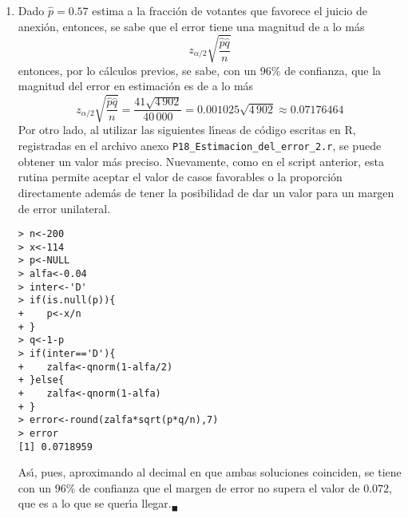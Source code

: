 \begin{solucion}
\begin{enumerate}
  \item Dado $\hat{p} = 0.57$ estima a la fracci\'on de votantes que favorece el juicio de anexi\'on, entonces, se sabe que el error tiene una magnitud de a lo m\'as
  \begin{equation*}
   z_{\alpha/2}\sqrt{\frac{\hat{p}\hat{q}}{n}}
  \end{equation*}
  entonces, por lo c\'alculos previos, se sabe, con un $96\%$ de confianza, que la magnitud del error en estimaci\'on es de a lo m\'as
  \begin{equation*}
   z_{\alpha/2}\sqrt{\frac{\hat{p}\hat{q}}{n}} = \frac{41\sqrt{4\,902}}{40\,000} = 0.001025\sqrt{4\,902} \approx 0.07176464
  \end{equation*}
  Por otro lado, al utilizar las siguientes l\'{\i}neas de c\'odigo escritas en R, registradas en el archivo anexo \texttt{P18\_Estimacion\_del\_error\_2.r}, se puede obtener un valor m\'as preciso. Nuevamente, como en el script anterior, esta rutina permite aceptar el valor de casos favorables o la proporci\'on directamente adem\'as de tener la posibilidad de dar un valor para un margen de error unilateral.
  \begin{verbatim}
> n<-200
> x<-114
> p<-NULL
> alfa<-0.04
> inter<-'D'
> if(is.null(p)){
+    p<-x/n
+ }
> q<-1-p
> if(inter=='D'){
+    zalfa<-qnorm(1-alfa/2)
+ }else{
+    zalfa<-qnorm(1-alfa)
+ }
> error<-round(zalfa*sqrt(p*q/n),7)
> error
[1] 0.0718959
  \end{verbatim}
  As\'{\i}, pues, aproximando al decimal en que ambas soluciones coinciden, se tiene con un $96\%$ de confianza que el margen de error no supera el valor de $0.072$, que es a lo que se quer\'{\i}a llegar.${}_{\blacksquare}$
 \end{enumerate}

\end{solucion}

